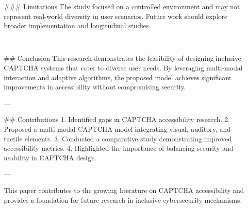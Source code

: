 ### Limitations  
The study focused on a controlled environment and may not represent real-world diversity in user scenarios. Future work should explore broader implementation and longitudinal studies.

---

## Conclusion  
This research demonstrates the feasibility of designing inclusive CAPTCHA systems that cater to diverse user needs. By leveraging multi-modal interaction and adaptive algorithms, the proposed model achieves significant improvements in accessibility without compromising security.  

---

## Contributions  
1. Identified gaps in CAPTCHA accessibility research.  
2. Proposed a multi-modal CAPTCHA model integrating visual, auditory, and tactile elements.  
3. Conducted a comparative study demonstrating improved accessibility metrics.  
4. Highlighted the importance of balancing security and usability in CAPTCHA design.  

---  

This paper contributes to the growing literature on CAPTCHA accessibility and provides a foundation for future research in inclusive cybersecurity mechanisms.